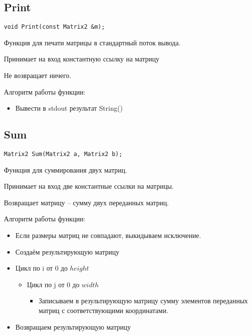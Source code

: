 \subsection*{Print}

\begin{lstlisting}[label={lst:Print}]
	void Print(const Matrix2 &m);
\end{lstlisting}

Функция для печати матрицы в стандартный поток вывода.

Принимает на вход константную ссылку на матрицу

Не возвращает ничего.

Алгоритм работы функции:

\begin{itemize}
	\item Вывести в stdout результат String()
\end{itemize}

\subsection*{Sum}

\begin{lstlisting}[label={lst:Sum}]
	Matrix2 Sum(Matrix2 a, Matrix2 b);
\end{lstlisting}

Функция для суммирования двух матриц.

Принимает на вход две константные ссылки на матрицы.

Возвращает матрицу -- сумму двух переданных матриц.

Алгоритм работы функции:

\begin{itemize}
	\item Если размеры матриц не совпадают, выкидываем исключение.
	\item Создаём результирующую матрицу
	\item Цикл по i от 0 до $ height $
	\begin{itemize}
		\item Цикл по j от 0 до $ width $
		\begin{itemize}
			\item Записываем в результирующую матрицу сумму
			элементов переданных матриц с соответствующими координатами.
		\end{itemize}
	\end{itemize}
	\item Возвращаем результирующую матрицу
\end{itemize}

